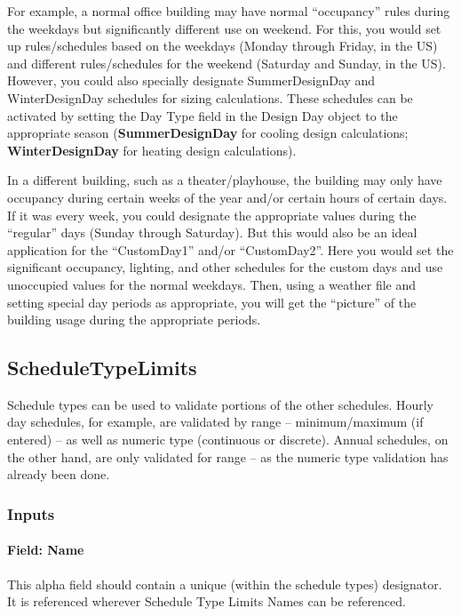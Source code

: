For example, a normal office building may have normal ``occupancy'' rules during the weekdays but significantly different use on weekend. For this, you would set up rules/schedules based on the weekdays (Monday through Friday, in the US) and different rules/schedules for the weekend (Saturday and Sunday, in the US). However, you could also specially designate SummerDesignDay and WinterDesignDay schedules for sizing calculations. These schedules can be activated by setting the Day Type field in the Design Day object to the appropriate season (\textbf{SummerDesignDay} for cooling design calculations; \textbf{WinterDesignDay} for heating design calculations).

In a different building, such as a theater/playhouse, the building may only have occupancy during certain weeks of the year and/or certain hours of certain days. If it was every week, you could designate the appropriate values during the ``regular'' days (Sunday through Saturday). But this would also be an ideal application for the ``CustomDay1'' and/or ``CustomDay2''. Here you would set the significant occupancy, lighting, and other schedules for the custom days and use unoccupied values for the normal weekdays. Then, using a weather file and setting special day periods as appropriate, you will get the ``picture'' of the building usage during the appropriate periods.

\subsection{ScheduleTypeLimits}\label{scheduletypelimits}

Schedule types can be used to validate portions of the other schedules. Hourly day schedules, for example, are validated by range -- minimum/maximum (if entered) -- as well as numeric type (continuous or discrete). Annual schedules, on the other hand, are only validated for range -- as the numeric type validation has already been done.

\subsubsection{Inputs}\label{inputs-042}

\paragraph{Field: Name}\label{field-name-041}

This alpha field should contain a unique (within the schedule types) designator. It is referenced wherever Schedule Type Limits Names can be referenced.

